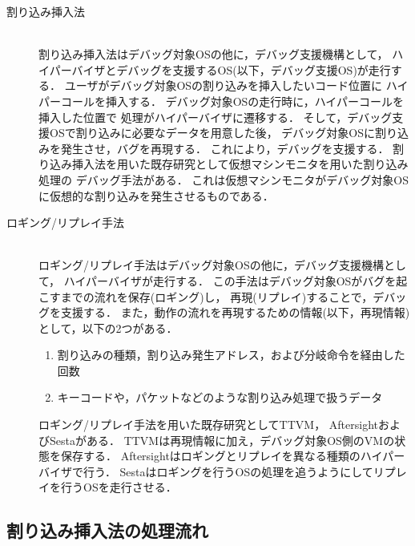 \documentclass[submit,techreq,noauthor,dvipdfmx]{ipsj}
\begin{document}
\begin{description}
    \item[割り込み挿入法]\mbox{}\\
        割り込み挿入法はデバッグ対象OSの他に，デバッグ支援機構として，
        ハイパーバイザとデバッグを支援するOS(以下，デバッグ支援OS)が走行する．
        ユーザがデバッグ対象OSの割り込みを挿入したいコード位置に
        ハイパーコールを挿入する．
        デバッグ対象OSの走行時に，ハイパーコールを挿入した位置で
        処理がハイパーバイザに遷移する．
        そして，デバッグ支援OSで割り込みに必要なデータを用意した後，
        デバッグ対象OSに割り込みを発生させ，バグを再現する．
        これにより，デバッグを支援する．
        割り込み挿入法を用いた既存研究として仮想マシンモニタを用いた割り込み処理の
        デバッグ手法\cite{miyahara}がある．
        これは仮想マシンモニタがデバッグ対象OSに仮想的な割り込みを発生させるものである．
    \item[ロギング/リプレイ手法]\mbox{}\\
        ロギング/リプレイ手法はデバッグ対象OSの他に，デバッグ支援機構として，
        ハイパーバイザが走行する．
        この手法はデバッグ対象OSがバグを起こすまでの流れを保存(ロギング)し，
        再現(リプレイ)することで，デバッグを支援する．
        また，動作の流れを再現するための情報(以下，再現情報)として，以下の2つがある．
        \begin{enumerate}
            \item 割り込みの種類，割り込み発生アドレス，および分岐命令を経由した回数\\
            \item キーコードや，パケットなどのような割り込み処理で扱うデータ
        \end{enumerate}
        ロギング/リプレイ手法を用いた既存研究としてTTVM\cite{samuel}，
        Aftersight\cite{jim}およびSesta\cite{kawasaki}がある．
        TTVMは再現情報に加え，デバッグ対象OS側のVMの状態を保存する．
        Aftersightはロギングとリプレイを異なる種類のハイパーバイザで行う．
        Sestaはロギングを行うOSの処理を追うようにしてリプレイを行うOSを走行させる．
\end{description}


\subsection{割り込み挿入法の処理流れ}\label{sec:processing_flow_interrupt_inserting_method}
\end{document}
